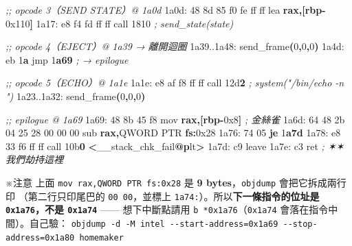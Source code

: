 \documentclass[10pt,a4paper]{article}
\newenvironment{Shaded}{\begin{snugshade}}{\end{snugshade}}
\newcommand{\BaseNTok}[1]{\textcolor[rgb]{0.00,0.00,0.81}{#1}}
\newcommand{\BuiltInTok}[1]{#1}
\newcommand{\CommentTok}[1]{\textcolor[rgb]{0.56,0.35,0.01}{\textit{#1}}}
\newcommand{\ControlFlowTok}[1]{\textcolor[rgb]{0.13,0.29,0.53}{\textbf{#1}}}
\newcommand{\DataTypeTok}[1]{\textcolor[rgb]{0.13,0.29,0.53}{#1}}
\newcommand{\DecValTok}[1]{\textcolor[rgb]{0.00,0.00,0.81}{#1}}
\newcommand{\ErrorTok}[1]{\textcolor[rgb]{0.64,0.00,0.00}{\textbf{#1}}}
\newcommand{\FunctionTok}[1]{\textcolor[rgb]{0.13,0.29,0.53}{\textbf{#1}}}
\newcommand{\KeywordTok}[1]{\textcolor[rgb]{0.13,0.29,0.53}{\textbf{#1}}}
\newcommand{\NormalTok}[1]{#1}
\newcommand{\OperatorTok}[1]{\textcolor[rgb]{0.81,0.36,0.00}{\textbf{#1}}}
\renewenvironment{Shaded}{%
  \def\FrameCommand{\fboxsep=3.2pt\colorbox{shadecolor}}%
  \MakeFramed{\advance\hsize-\width\FrameRestore\small}%
}{%
  \endMakeFramed
}
\renewenvironment{quote}{%
  \begin{mdframed}[linewidth=0pt,innerleftmargin=0pt,innerrightmargin=0pt,
    innerbottommargin=0pt,innertopmargin=0pt,skipabove=0.55em,skipbelow=0.55em,
    leftmargin=0.9em,rightmargin=0.4em,startcode={\color{quotebar}\vrule width 2.6pt},%
    endcode={}]%
  \itshape\color{black}%
}{%
  \end{mdframed}%
}
\begin{document}
\begin{Shaded}
\begin{Highlighting}[]
\CommentTok{;; opcode 3（SEND STATE）@ 1a0d}
\NormalTok{1a0d: 48 8d 85 f0 fe ff ff   lea    }\KeywordTok{rax}\OperatorTok{,[}\KeywordTok{rbp}\OperatorTok{{-}}\BaseNTok{0x110}\OperatorTok{]}
\NormalTok{1a17: e8 f4 fd ff ff         call   }\DecValTok{1810}                      \CommentTok{; send\_state(state)}

\CommentTok{;; opcode 4（EJECT）@ 1a39 → 離開迴圈}
\NormalTok{1a39..1a48: send\_frame}\OperatorTok{(}\DecValTok{0}\OperatorTok{,}\DecValTok{0}\OperatorTok{,}\DecValTok{0}\OperatorTok{)}
\NormalTok{1a4d: eb }\DecValTok{1}\ErrorTok{a}\NormalTok{                  jmp    }\DecValTok{1}\ErrorTok{a69}                      \CommentTok{; → epilogue}

\CommentTok{;; opcode 5（ECHO）@ 1a1e}
\NormalTok{1a1e: e8 af f8 ff ff         call   }\DecValTok{12}\BaseNTok{d}\ErrorTok{2}                      \CommentTok{; system("/bin/echo {-}n \textquotesingle{}\textquotesingle{}")}
\NormalTok{1a23..1a32: send\_frame}\OperatorTok{(}\DecValTok{0}\OperatorTok{,}\DecValTok{0}\OperatorTok{,}\DecValTok{0}\OperatorTok{)}

\CommentTok{;; epilogue @ 1a69}
\NormalTok{1a69: 48 8b 45 f8            mov    }\KeywordTok{rax}\OperatorTok{,[}\KeywordTok{rbp}\OperatorTok{{-}}\BaseNTok{0x8}\OperatorTok{]}             \CommentTok{; 金絲雀}
\NormalTok{1a6d: 64 48 2b 04 25 28 00 00 00  }\BuiltInTok{sub} \KeywordTok{rax}\OperatorTok{,}\DataTypeTok{QWORD} \DataTypeTok{PTR} \KeywordTok{fs}\OperatorTok{:}\BaseNTok{0x28}
\NormalTok{1a76: 74 05                  }\ControlFlowTok{je}     \DecValTok{1}\ErrorTok{a7d}
\NormalTok{1a78: e8 }\DecValTok{33}\NormalTok{ f6 ff ff         call   }\BaseNTok{10b}\ErrorTok{0} \OperatorTok{\textless{}}\NormalTok{\_\_stack\_chk\_fail}\FunctionTok{@}\ErrorTok{p}\NormalTok{lt}\OperatorTok{\textgreater{}}
\NormalTok{1a7d: c9                     leave}
\NormalTok{1a7e: c3                     ret                            }\CommentTok{; ✶✶ 我們劫持這裡}
\end{Highlighting}
\end{Shaded}

\begin{quote}
※注意 上面 \texttt{mov\ \allowbreak{}rax,\allowbreak{}QWORD\ \allowbreak{}PTR\ \allowbreak{}fs:\allowbreak{}0x28} 是 \textbf{9
bytes}，\texttt{objdump} 會把它拆成兩行印 （第二行只印尾巴的
\texttt{00\ \allowbreak{}00}，並標上 \texttt{1a74:}）。所以\textbf{下一條指令的位址是
\texttt{0x1a76}，不是 \texttt{0x1a74}} ------ 想下中斷點請用
\texttt{b\ \allowbreak{}*0x1a76}（\texttt{0x1a74} 會落在指令中間）。自己驗：
\texttt{objdump\ \allowbreak{}-\allowbreak{}d\ \allowbreak{}-\allowbreak{}M\ \allowbreak{}intel\ \allowbreak{}-\allowbreak{}\/\allowbreak{}-\allowbreak{}start-\allowbreak{}address=0x1a69\ \allowbreak{}-\allowbreak{}\/\allowbreak{}-\allowbreak{}stop-\allowbreak{}address=0x1a80\ \allowbreak{}homemaker}
\end{quote}
\end{document}
